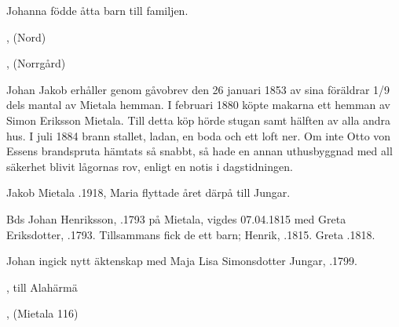 Johanna födde åtta barn till familjen.
\begin{jhchildren}
  \item {}, (Nord)
  \item {}
  \item {}
  \item {}
  \item {}
  \item {}
  \item {}, (Norrgård)
  \item {}
\end{jhchildren}
Johan Jakob erhåller genom gåvobrev den 26 januari 1853 av sina föräldrar 1/9 dels mantal av Mietala hemman. I februari 1880 köpte makarna ett hemman av Simon Eriksson Mietala. Till detta köp hörde stugan samt hälften av alla andra hus. I juli 1884 brann stallet, ladan, en boda och ett loft ner. Om inte Otto von Essens brandspruta hämtats så snabbt, så hade en annan uthusbyggnad med all säkerhet blivit lågornas rov, enligt en notis i dagstidningen.

Jakob Mietala .1918, Maria flyttade året därpå till Jungar.


Bds Johan Henriksson, .1793 på Mietala, vigdes 07.04.1815 med Greta Eriksdotter, .1793. Tillsammans fick de ett barn; Henrik, .1815.
Greta .1818.

Johan ingick nytt äktenskap med Maja Lisa Simonsdotter Jungar, .1799.
\begin{jhchildren}
  \item {}
  \item {}
  \item {}
  \item {}
  \item {}
  \item {}, till Alahärmä
  \item {}, (Mietala 116)
  \item {}
\end{jhchildren}

